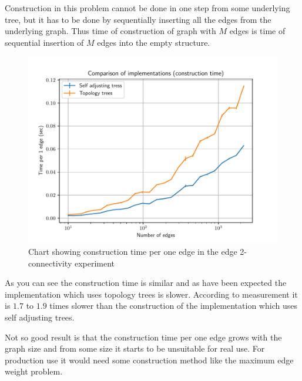 Construction in this problem cannot be done in one step from some underlying
tree, but it has to be done by sequentially inserting all the edges from the
underlying graph. Thus time of construction of graph with $M$ edges is time of
sequential insertion of $M$ edges into the empty structure.

\begin{figure}[H]
\centering
{}\hsize
\includegraphics[width=\hsize]{charts/double_edge_connectivity_construction.pdf}
\caption[Chart of construction time per edge in the edge 2-connectivity experiment]
{Chart showing construction time per one edge in the edge 2-connectivity experiment}
\end{figure}

As you can see the construction time is similar and as have been expected the
implementation which uses topology trees is slower. According to measurement
it is $1.7$ to $1.9$ times slower than the construction of the implementation
which uses self adjusting trees.

Not so good result is that the construction time per one edge grows with the
graph size and from some size it starts to be unsuitable for real use. For
production use it would need some construction method like the maximum edge
weight problem.
